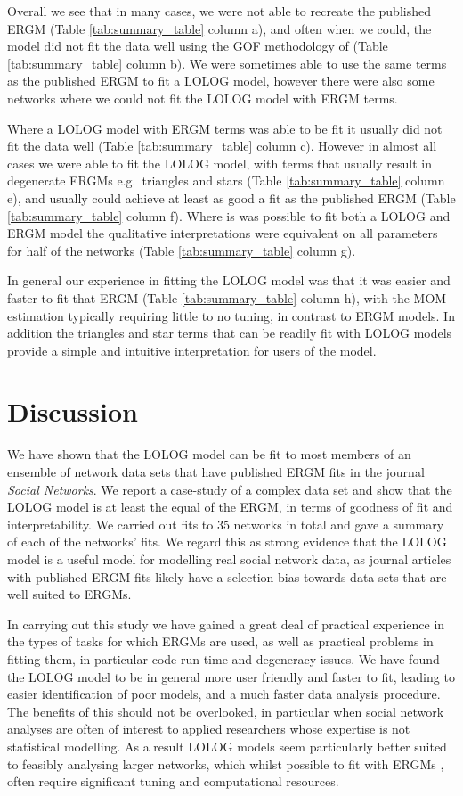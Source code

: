\documentclass[
]{statsoc}
\begin{document}
Overall we see that in many cases, we were not able to recreate the
published ERGM (Table \ref{tab:summary_table} column a), and often when
we could, the model did not fit the data well using the GOF methodology
of \cite{Hunter_Goodreau_2008} (Table \ref{tab:summary_table} column b).
We were sometimes able to use the same terms as the published ERGM to
fit a LOLOG model, however there were also some networks where we could
not fit the LOLOG model with ERGM terms.

Where a LOLOG model with ERGM terms was able to be fit it usually did
not fit the data well (Table \ref{tab:summary_table} column c). However
in almost all cases we were able to fit the LOLOG model, with terms that
usually result in degenerate ERGMs e.g.~triangles and stars (Table
\ref{tab:summary_table} column e), and usually could achieve at least as
good a fit as the published ERGM (Table \ref{tab:summary_table} column
f). Where is was possible to fit both a LOLOG and ERGM model the
qualitative interpretations were equivalent on all parameters for half
of the networks (Table \ref{tab:summary_table} column g).

In general our experience in fitting the LOLOG model was that it was
easier and faster to fit that ERGM (Table \ref{tab:summary_table} column
h), with the MOM estimation typically requiring little to no tuning, in
contrast to ERGM models. In addition the triangles and star terms that
can be readily fit with LOLOG models provide a simple and intuitive
interpretation for users of the model.

\section{Discussion}\label{sec:discussion}

We have shown that the LOLOG model can be fit to most members of an
ensemble of network data sets that have published ERGM fits in the
journal \textit{Social Networks}. We report a case-study of a complex
data set and show that the LOLOG model is at least the equal of the
ERGM, in terms of goodness of fit and interpretability. We carried out
fits to \(35\) networks in total and gave a summary of each of the
networks' fits. We regard this as strong evidence that the LOLOG model
is a useful model for modelling real social network data, as journal
articles with published ERGM fits likely have a selection bias towards
data sets that are well suited to ERGMs.

In carrying out this study we have gained a great deal of practical
experience in the types of tasks for which ERGMs are used, as well as
practical problems in fitting them, in particular code run time and
degeneracy issues. We have found the LOLOG model to be in general more
user friendly and faster to fit, leading to easier identification of
poor models, and a much faster data analysis procedure. The benefits of
this should not be overlooked, in particular when social network
analyses are often of interest to applied researchers whose expertise is
not statistical modelling. As a result LOLOG models seem particularly
better suited to feasibly analysing larger networks, which whilst
possible to fit with ERGMs \citep{stivala2020}, often require
significant tuning and computational resources.
\end{document}
